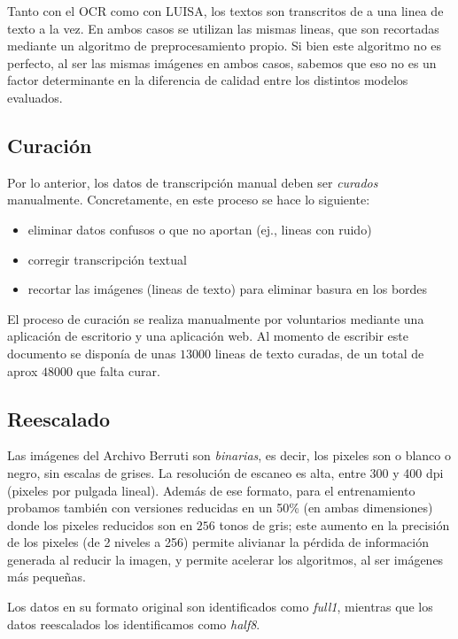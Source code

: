 \documentclass{article}
\begin{document}
Tanto con el OCR como con LUISA, los textos son transcritos de a una linea de texto a la vez.
En ambos casos se utilizan las mismas lineas, que son recortadas mediante un algoritmo
de preprocesamiento propio. Si bien este algoritmo no es perfecto, al ser las mismas
imágenes en ambos casos, sabemos que eso no es un factor determinante en la diferencia
de calidad entre los distintos modelos evaluados.

\subsection{Curación}

Por lo anterior, los datos de transcripción manual deben ser \emph{curados}
manualmente. Concretamente, en este proceso se hace lo siguiente:

\begin{itemize}
\item eliminar datos confusos o que no aportan (ej., lineas con ruido)
\item corregir transcripción textual
\item recortar las imágenes (lineas de texto) para eliminar basura en los bordes
\end{itemize}

El proceso de curación se realiza manualmente  por voluntarios 
mediante una aplicación de escritorio y una aplicación web. Al momento de escribir este documento
se disponía de unas $13000$  lineas de texto curadas, de un total de aprox $48000$ que falta curar.

\subsection{Reescalado} Las imágenes del Archivo Berruti son
\emph{binarias}, es decir, los pixeles son o blanco o negro, sin escalas de grises.
La resolución de escaneo es alta, entre 300 y 400 dpi (pixeles por pulgada lineal).
Además de ese formato, para el entrenamiento probamos también con versiones reducidas en un 50\%
(en ambas dimensiones) donde los pixeles reducidos son en $256$ tonos de gris; este 
aumento en la precisión de los pixeles (de 2 niveles a 256) permite alivianar
la pérdida de información generada al reducir la imagen, y permite acelerar los algoritmos,
al ser imágenes más pequeñas.

Los datos en su formato original son identificados como \emph{full1}, mientras que los datos
reescalados los identificamos como \emph{half8}.
\end{document}
